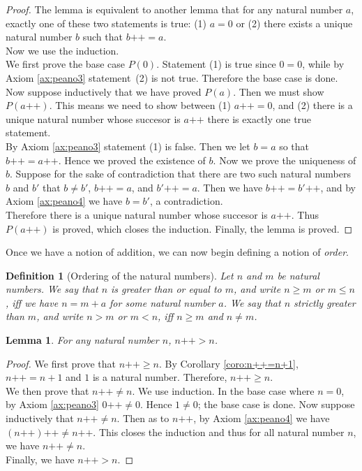 \documentclass[a4paper,oneside]{book}
\newtheorem*{proof}{\textit{Proof.}}
\newtheorem{definition}{Definition}[section]
\newtheorem{lemma}{Lemma}[section]
\begin{document}
			\begin{proof}
				The lemma is equivalent to another lemma that for any natural number $a$, exactly one of these two statements is true: (1) $a=0$ or (2) there exists a unique natural number $b$ such that $b\texttt{++}=a$.\\
				Now we use the induction.\\
				We first prove the base case $P(0)$. Statement (1) is true since $0=0$, while by Axiom \ref{ax:peano3} statement~(2) is not true. Therefore the base case is done.\\
				Now suppose inductively that we have proved $P(a)$. Then we must show $P(a\texttt{++})$. This means we need to show between (1) $a\texttt{++}=0$, and (2) there is a unique natural number whose succesor is $a\texttt{++}$ there is exactly one true statement.\\
				By Axiom \ref{ax:peano3} statement (1) is false. Then we let $b=a$ so that $b\texttt{++}=a\texttt{++}$. Hence we proved the existence of $b$. Now we prove the uniqueness of $b$. Suppose for the sake of contradiction that there are two such natural numbers $b$ and $b'$ that $b \neq b'$, $b\texttt{++}=a$, and $b'\texttt{++}=a$. Then we have $b\texttt{++}=b'\texttt{++}$, and by Axiom \ref{ax:peano4} we have $b=b'$, a contradiction.
				\\Therefore there is a unique natural number whose succesor is $a\texttt{++}$. Thus $P(a\texttt{++})$ is proved, which closes the induction. Finally, the lemma is proved.
			\end{proof}
			Once we have a notion of addition, we can now begin defining a notion of \textit{order}.
			\begin{definition}[Ordering of the natural numbers]
				\label{def:order of natural numbers}
				Let $n$ and $m$ be natural numbers. We say that $n$ is greater than or equal to $m$, and write $n \geq m$ or $m \leq n$, iff we have $n=m+a$ for some natural number $a$. We say that $n$ strictly greater than $m$, and write $n>m$ or $m<n$, iff $n \geq m$ and $n\neq m$.
			\end{definition}
			\begin{lemma}
				\label{lem:n++>n}
				For any natural number $n$, $n\texttt{++}>n$.
			\end{lemma}
			\begin{proof}
				We first prove that $n\texttt{++} \geq n$. By Corollary \ref{coro:n++=n+1}, $n\texttt{++}=n+1$ and $1$ is a natural number. Therefore, $n\texttt{++} \geq n$.\\
				We then prove that $n\texttt{++}\neq n$. We use induction. In the base case where $n=0$, by Axiom \ref{ax:peano3} $0\texttt{++} \neq 0$. Hence $1 \neq 0$; the base case is done. Now suppose inductively that $n\texttt{++}\neq n$. Then as to $n\texttt{++}$, by Axiom \ref{ax:peano4} we have $(n\texttt{++})\texttt{++}\neq n\texttt{++}$. This closes the induction and thus for all natural number $n$, we have $n\texttt{++}\neq n$.\\
				Finally, we have $n\texttt{++}>n$.
			\end{proof}
\end{document}

